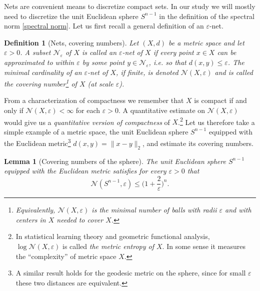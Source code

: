\documentclass[10pt, openany]{book}
\newtheorem{lemma}[theorem]{Lemma}
\newtheorem{definition}[theorem]{Definition}
\theoremstyle{remark}
\def \NN {\mathcal{N}}
\def \e {\varepsilon}
\begin{document}
Nets are convenient means to discretize compact sets. In our study we will mostly need 
to discretize the unit Euclidean sphere $S^{n-1}$ in the definition of the spectral norm \eqref{spectral norm}. 
Let us first recall a general definition of an $\e$-net. 

\begin{definition}[Nets, covering numbers]	 
  Let $(X,d)$ be a metric space and let $\e>0$. 
  A subset $\NN_\e$ of $X$ is called an {\em $\e$-net} of $X$
  if every point $x \in X$ can be approximated to within $\e$ 
  by some point $y \in \NN_\e$, i.e. so that 
  $d(x,y) \le \e$.
  The minimal cardinality of an $\e$-net of $X$, if finite, is denoted $\NN(X,\e)$
  and is called the {\em covering number}\footnote{Equivalently, $\NN(X,\e)$ is the minimal 
    number of balls with radii $\e$ and with centers in $X$ needed to cover $X$.} 
  of $X$ (at scale $\e$).
\end{definition}

From a characterization of compactness we remember that $X$ is compact 
if and only if $\NN(X,\e) < \infty$ for each $\e > 0$. 
A quantitative estimate on $\NN(X, \e)$
would give us a {\em quantitative version of compactness} of $X$.\footnote{In 
  statistical learning theory and geometric functional analysis, 
  $\log \NN(X,\e)$ is called {\em the metric entropy of $X$}. 
  In some sense it measures the ``complexity'' of metric space $X$.}
Let us therefore take a simple example of a metric space, the unit Euclidean sphere $S^{n-1}$ 
equipped with the Euclidean metric\footnote{A similar result holds for the 
geodesic metric on the sphere, since for small $\e$ these two distances are equivalent.}
$d(x,y) = \|x-y\|_2$, and estimate its covering numbers. 

\begin{lemma}[Covering numbers of the sphere]                     				\label{net cardinality}
  The unit Euclidean sphere $S^{n-1}$ equipped with the Euclidean metric satisfies
  for every $\e>0$ that 
  $$
  \NN(S^{n-1},\e) \le \Big( 1 + \frac{2}{\e} \Big)^n.
  $$
\end{lemma}
\end{document}
